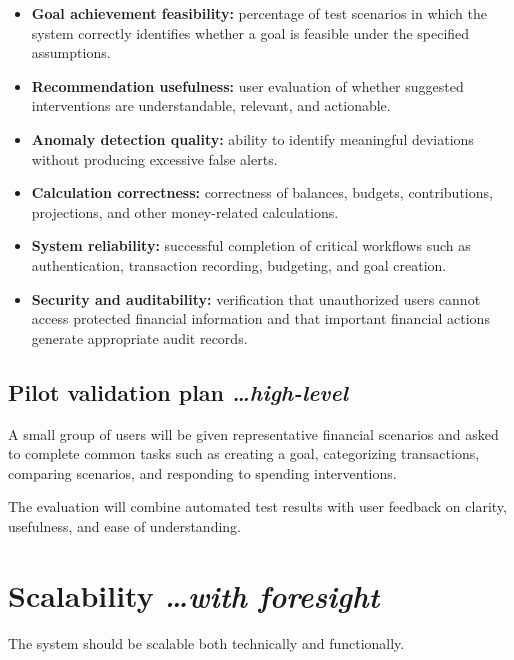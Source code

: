 \documentclass[11pt,a4paper]{article}
\newcommand{\BvrHint}[1]{%
  {\normalfont\normalsize\itshape\hfill #1}}
\begin{document}
\begin{itemize}[leftmargin=0.7cm]
    \item \textbf{Goal achievement feasibility:} percentage of test scenarios
    in which the system correctly identifies whether a goal is feasible under
    the specified assumptions.
    
    \item \textbf{Recommendation usefulness:} user evaluation of whether
    suggested interventions are understandable, relevant, and actionable.
    
    \item \textbf{Anomaly detection quality:} ability to identify meaningful
    deviations without producing excessive false alerts.
    
    \item \textbf{Calculation correctness:} correctness of balances, budgets,
    contributions, projections, and other money-related calculations.
    
    \item \textbf{System reliability:} successful completion of critical
    workflows such as authentication, transaction recording, budgeting, and
    goal creation.
    
    \item \textbf{Security and auditability:} verification that unauthorized
    users cannot access protected financial information and that important
    financial actions generate appropriate audit records.
\end{itemize}


\subsection{Pilot validation plan%
  \BvrHint{\ldots high-level}}

A small group of users will be given representative financial scenarios and
asked to complete common tasks such as creating a goal, categorizing
transactions, comparing scenarios, and responding to spending interventions.

The evaluation will combine automated test results with user feedback on
clarity, usefulness, and ease of understanding.


\section{Scalability%
  \BvrHint{\ldots with foresight}}

The system should be scalable both technically and functionally.
\end{document}
